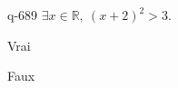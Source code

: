 \begin{truefalse}{q-689}
$\exists x \in \mathbb R,\: (x+2)^2>3$.
\item* Vrai
\item Faux
\end{truefalse}


